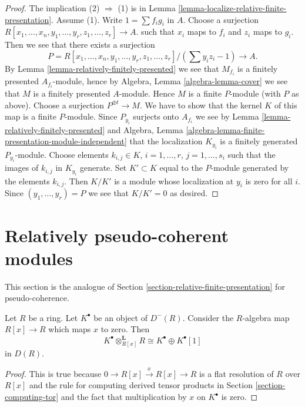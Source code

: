\begin{proof}
The implication (2) $\Rightarrow$ (1) is in
Lemma \ref{lemma-localize-relative-finite-presentation}.
Assume (1). Write $1 = \sum f_ig_i$ in $A$.
Choose a surjection
$R[x_1, \ldots, x_n, y_1, \ldots, y_r, z_1, \ldots, z_r] \to A$.
such that $x_i$ maps to $f_i$ and $z_i$ maps to $g_i$. Then we
see that there exists a surjection
$$
P = R[x_1, \ldots, x_n, y_1, \ldots, y_r, z_1, \ldots, z_r]/(\sum y_iz_i - 1)
\longrightarrow
A.
$$
By
Lemma \ref{lemma-relatively-finitely-presented}
we see that $M_{f_i}$ is a finitely presented $A_{f_i}$-module, hence by
Algebra, Lemma \ref{algebra-lemma-cover}
we see that $M$ is a finitely presented $A$-module.
Hence $M$ is a finite $P$-module (with $P$ as above).
Choose a surjection $P^{\oplus t} \to M$.
We have to show that the kernel $K$ of this map is a finite
$P$-module. Since $P_{y_i}$ surjects onto
$A_{f_i}$ we see by
Lemma \ref{lemma-relatively-finitely-presented}
and
Algebra, Lemma \ref{algebra-lemma-finite-presentation-module-independent}
that the localization $K_{y_i}$ is a finitely generated
$P_{y_i}$-module. Choose elements
$k_{i, j} \in K$, $i = 1, \ldots, r$, $j = 1, \ldots, s_i$ such
that the images of $k_{i, j}$ in $K_{y_i}$ generate.
Set $K' \subset K$ equal to the $P$-module
generated by the elements $k_{i, j}$. Then $K/K'$ is a module
whose localization at $y_i$ is zero for all $i$. Since $(y_1, \ldots, y_r) = P$
we see that $K/K' = 0$ as desired.
\end{proof}










\section{Relatively pseudo-coherent modules}
\label{section-relative-pseudo-coherent}

\noindent
This section is the analogue of
Section \ref{section-relative-finite-presentation}
for pseudo-coherence.

\begin{lemma}
\label{lemma-pull-push}
Let $R$ be a ring. Let $K^\bullet$ be an object of $D^{-}(R)$.
Consider the $R$-algebra map $R[x] \to R$ which maps $x$ to zero. Then
$$
K^\bullet \otimes_{R[x]}^{\mathbf{L}} R \cong K^\bullet \oplus K^\bullet[1]
$$
in $D(R)$.
\end{lemma}

\begin{proof}
This is true because $0 \to R[x] \xrightarrow{x} R[x] \to R$
is a flat resolution of $R$ over $R[x]$ and the rule for computing
derived tensor products in
Section \ref{section-computing-tor}
and the fact that multiplication by $x$ on $K^\bullet$ is zero.
\end{proof}


